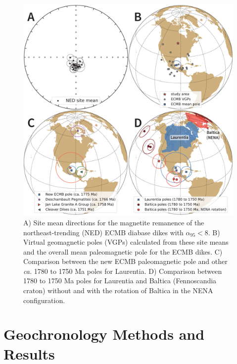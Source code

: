 \documentclass[draft]{agujournal2019}
\begin{document}
\begin{figure}[!ht]
\noindent\includegraphics[width=\textwidth]{./figures/paleomag_site_directions_pole.pdf}
\caption{\small{A) Site mean directions for the magnetite remanence of the northeast-trending (NED) ECMB diabase dikes with $\alpha_{95}<8$\textdegree. B) Virtual geomagnetic poles (VGPs) calculated from these site means and the overall mean paleomagnetic pole for the ECMB dikes. C) Comparison between the new ECMB paleomagnetic pole and other \textit{ca.} 1780 to 1750 Ma poles for Laurentia. D) Comparison between 1780 to 1750 Ma poles for Laurentia and Baltica (Fennoscandia craton) without and with the rotation of Baltica in the NENA configuration.}}
\label{fig:site_means}
\end{figure}

\section*{Geochronology Methods and Results}
\end{document}
